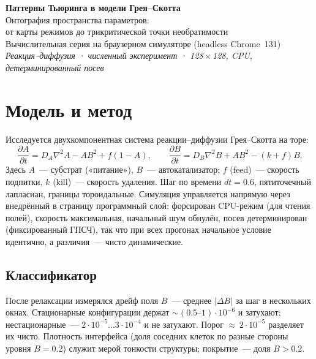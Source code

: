 \documentclass[11pt]{article}
\newcommand{\hruleline}{\vspace{-2pt}{\color{acrule}\hrule height 0.6pt}\vspace{6pt}}
\begin{document}
\thispagestyle{fancy}
\vspace*{45mm}
\begin{center}
{\sffamily\bfseries\fontsize{23}{28}\selectfont\color{acmag}
Паттерны Тьюринга в модели Грея–Скотта}\\[5mm]
{\sffamily\large\color{acgrey}
Онтография пространства параметров:\\ от карты режимов до трикритической точки необратимости}\\[10mm]
{\sffamily\normalsize\color{acgrey}
Вычислительная серия на браузерном симуляторе (headless Chrome~131)}\\[55mm]
{\itshape\small\color{acgrey}
Реакция–диффузия · численный эксперимент · 128\,$\times$\,128, CPU, детерминированный посев}
\end{center}
\clearpage

\section{Модель и метод}
\hruleline
Исследуется двухкомпонентная система реакции–диффузии Грея–Скотта на торе:
\begin{equation*}
\frac{\partial A}{\partial t}=D_A\nabla^2 A-AB^2+f(1-A),\qquad
\frac{\partial B}{\partial t}=D_B\nabla^2 B+AB^2-(k+f)B .
\end{equation*}
Здесь $A$~— субстрат («питание»), $B$~— автокатализатор; $f$ (feed)~— скорость подпитки,
$k$ (kill)~— скорость удаления. Шаг по времени $dt=0.6$, пятиточечный лапласиан, границы
тороидальные. Симуляция управляется напрямую через внедрённый в страницу программный слой:
форсирован CPU-режим (для чтения полей), скорость максимальная, начальный шум обнулён, посев
детерминирован (фиксированный ГПСЧ), так что при всех прогонах начальное условие идентично, а
различия~— чисто динамические.

\subsection{Классификатор}
После релаксации измерялся дрейф поля $B$~— среднее $|\Delta B|$ за шаг в нескольких окнах.
Стационарные конфигурации держат ${\sim}(0.5\text{--}1)\cdot10^{-6}$ и затухают; нестационарные~—
$2\cdot10^{-5}\ldots3\cdot10^{-4}$ и не затухают. Порог ${\approx}\,2\cdot10^{-5}$ разделяет их чисто.
Плотность интерфейса (доля соседних клеток по разные стороны уровня $B=0.2$) служит мерой тонкости
структуры; покрытие~— доля $B>0.2$.
\end{document}
